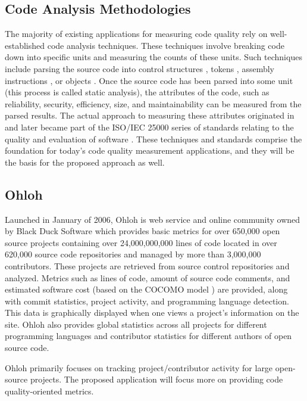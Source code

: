 \documentclass{sig-alternate}
\begin{document}
\subsection{Code Analysis Methodologies}
The majority of existing applications for measuring code quality rely on well-established code analysis techniques. These techniques involve breaking code down into specific units and measuring the counts of these units. Such techniques include parsing the source code into control structures \cite{mccabe1976complexity}, tokens \cite{halstead1977elements}, assembly instructions \cite{park1992software}, or objects \cite{chidamber1994metrics}. Once the source code has been parsed into some unit (this process is called static analysis), the attributes of the code, such as reliability, security, efficiency, size, and maintainability can be measured from the parsed results. The actual approach to measuring these attributes originated in \cite{boehm1976quantitative} and later became part of the ISO/IEC 25000 series of standards relating to the quality and evaluation of software \cite{iso2011iec}. These techniques and standards comprise the foundation for today's code quality measurement applications, and they will be the basis for the proposed approach as well.

\subsection{Ohloh}
Launched in January of 2006, Ohloh \cite{allen2009ohloh} is web service and online community owned by Black Duck Software which provides basic metrics for over 650,000 open source projects containing over 24,000,000,000 lines of code located in over 620,000 source code repositories and managed by more than 3,000,000 contributors. These projects are retrieved from source control repositories and analyzed. Metrics such as lines of code, amount of source code comments, and estimated software cost (based on the COCOMO model \cite{boehm2000software}) are provided, along with commit statistics, project activity, and programming language detection. This data is graphically displayed when one views a project's information on the site. Ohloh also provides global statistics across all projects for different programming languages and contributor statistics for different authors of open source code. 

Ohloh primarily focuses on tracking project/contributor activity for large open-source projects. The proposed application will focus more on providing code quality-oriented metrics.
\end{document}
